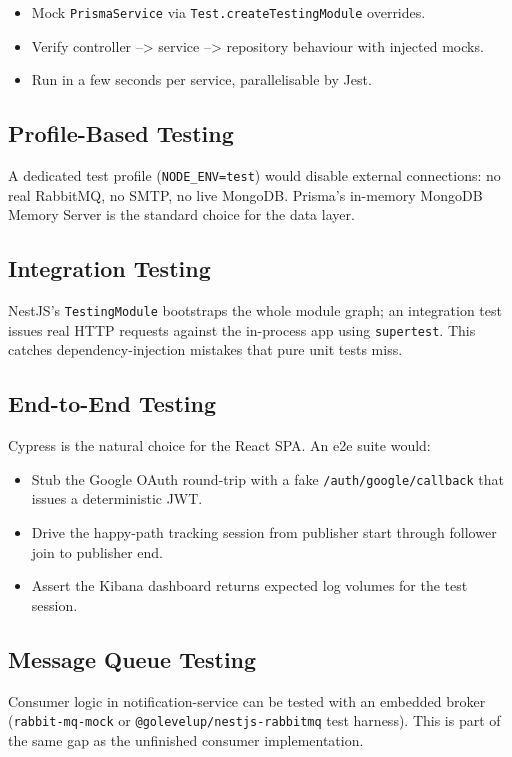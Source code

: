 \documentclass[11pt,a4paper]{article}
\begin{document}
\begin{itemize}[leftmargin=*]
  \item Mock \texttt{PrismaService} via \texttt{Test.createTestingModule}
        overrides.
  \item Verify controller --> service --> repository behaviour with
        injected mocks.
  \item Run in a few seconds per service, parallelisable by Jest.
\end{itemize}

\subsection{Profile-Based Testing}
A dedicated test profile (\texttt{NODE\_ENV=test}) would disable
external connections: no real RabbitMQ, no SMTP, no live MongoDB.
Prisma's in-memory MongoDB Memory Server is the standard choice for
the data layer.

\subsection{Integration Testing}
NestJS's \texttt{TestingModule} bootstraps the whole module graph;
an integration test issues real HTTP requests against the in-process
app using \texttt{supertest}.  This catches dependency-injection
mistakes that pure unit tests miss.

\subsection{End-to-End Testing}
Cypress is the natural choice for the React SPA.  An e2e suite would:

\begin{itemize}[leftmargin=*]
  \item Stub the Google OAuth round-trip with a fake \texttt{/auth/google/callback}
        that issues a deterministic JWT.
  \item Drive the happy-path tracking session from publisher start
        through follower join to publisher end.
  \item Assert the Kibana dashboard returns expected log volumes
        for the test session.
\end{itemize}

\subsection{Message Queue Testing}
Consumer logic in notification-service can be tested with an
embedded broker (\texttt{rabbit-mq-mock} or
\texttt{@golevelup/nestjs-rabbitmq} test harness).  This is part of
the same gap as the unfinished consumer implementation.
\end{document}
